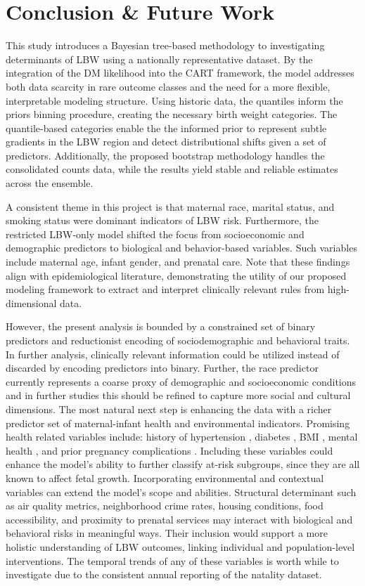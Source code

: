 \chapter{Conclusion \& Future Work}
\label{chap:conclusion}

This study introduces a Bayesian tree-based methodology to investigating determinants of LBW using a nationally representative dataset. By the integration of the DM likelihood into the CART framework, the model addresses both data scarcity in rare outcome classes and the need for a more flexible, interpretable modeling structure. Using historic data, the quantiles inform the priors binning procedure, creating the necessary birth weight categories. The quantile-based categories enable the the informed prior to represent subtle gradients in the LBW region and detect distributional shifts given a set of predictors. Additionally, the proposed bootstrap methodology handles the consolidated counts data, while the results yield stable and reliable estimates across the ensemble. 

A consistent theme in this project is that maternal race, marital status, and smoking status were dominant indicators of LBW risk. Furthermore, the restricted LBW-only model shifted the focus from socioeconomic and demographic predictors to biological and behavior-based variables. Such variables include maternal age, infant gender, and prenatal care. Note that these findings align with epidemiological literature, demonstrating the utility of our proposed modeling framework to extract and interpret clinically relevant rules from high-dimensional data. 

However, the present analysis is bounded by a constrained set of binary predictors and reductionist encoding of sociodemographic and behavioral traits. In further analysis, clinically relevant information could be utilized instead of discarded by encoding predictors into binary. Further, the race predictor currently represents a coarse proxy of demographic and socioeconomic conditions and in further studies this should be refined to capture more social and cultural dimensions. The most natural next step is enhancing the data with a richer predictor set of maternal-infant health and environmental indicators. Promising health related variables include: history of hypertension \parencite{hypertension_lbw}, diabetes \parencite{diabetes_lbw}, BMI \parencite{bmi_lbw} , mental health \parencite{mental_lbw}, and prior pregnancy complications \parencite{prior_lbw}. Including these variables could enhance the model's ability to further classify at-risk subgroups, since they are all known to affect fetal growth. Incorporating environmental and contextual variables can extend the model's scope and abilities. Structural determinant such as air quality metrics, neighborhood crime rates, housing conditions, food accessibility, and proximity to prenatal services may interact with biological and behavioral risks in meaningful ways. Their inclusion would support a more holistic understanding of LBW outcomes, linking individual and population-level interventions. The temporal trends of any of these variables is worth while to investigate due to the consistent annual reporting of the natality dataset.

